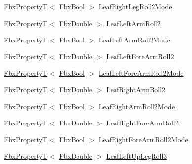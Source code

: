 \begin{DoxyCompactItemize}
\item 
\hyperlink{class_fbx_property_t}{Fbx\+PropertyT}$<$ \hyperlink{fbxtypes_8h_a92e0562b2fe33e76a242f498b362262e}{Fbx\+Bool} $>$ \hyperlink{class_fbx_character_adc56cbb72fb721c15569e4906be0b2bb}{Leaf\+Right\+Leg\+Roll2\+Mode}
\item 
\hyperlink{class_fbx_property_t}{Fbx\+PropertyT}$<$ \hyperlink{fbxtypes_8h_a171e72a1c46fc15c1a6c9c31948c1c5b}{Fbx\+Double} $>$ \hyperlink{class_fbx_character_a85afb25be41e4215494c040a5e162e14}{Leaf\+Left\+Arm\+Roll2}
\item 
\hyperlink{class_fbx_property_t}{Fbx\+PropertyT}$<$ \hyperlink{fbxtypes_8h_a92e0562b2fe33e76a242f498b362262e}{Fbx\+Bool} $>$ \hyperlink{class_fbx_character_a02394963e116e6ef922a28db31133830}{Leaf\+Left\+Arm\+Roll2\+Mode}
\item 
\hyperlink{class_fbx_property_t}{Fbx\+PropertyT}$<$ \hyperlink{fbxtypes_8h_a171e72a1c46fc15c1a6c9c31948c1c5b}{Fbx\+Double} $>$ \hyperlink{class_fbx_character_aca4aad2d5dc46cb61dd8ad54aeef10ff}{Leaf\+Left\+Fore\+Arm\+Roll2}
\item 
\hyperlink{class_fbx_property_t}{Fbx\+PropertyT}$<$ \hyperlink{fbxtypes_8h_a92e0562b2fe33e76a242f498b362262e}{Fbx\+Bool} $>$ \hyperlink{class_fbx_character_aef6a91eaa820543ae718cf34569a99be}{Leaf\+Left\+Fore\+Arm\+Roll2\+Mode}
\item 
\hyperlink{class_fbx_property_t}{Fbx\+PropertyT}$<$ \hyperlink{fbxtypes_8h_a171e72a1c46fc15c1a6c9c31948c1c5b}{Fbx\+Double} $>$ \hyperlink{class_fbx_character_a6444cc6b1cbea36a03d6555c7e0cf7b8}{Leaf\+Right\+Arm\+Roll2}
\item 
\hyperlink{class_fbx_property_t}{Fbx\+PropertyT}$<$ \hyperlink{fbxtypes_8h_a92e0562b2fe33e76a242f498b362262e}{Fbx\+Bool} $>$ \hyperlink{class_fbx_character_ad9796935aff85739df826d3b6ed63287}{Leaf\+Right\+Arm\+Roll2\+Mode}
\item 
\hyperlink{class_fbx_property_t}{Fbx\+PropertyT}$<$ \hyperlink{fbxtypes_8h_a171e72a1c46fc15c1a6c9c31948c1c5b}{Fbx\+Double} $>$ \hyperlink{class_fbx_character_a664e5dc50594ae77d3890192e9d2974e}{Leaf\+Right\+Fore\+Arm\+Roll2}
\item 
\hyperlink{class_fbx_property_t}{Fbx\+PropertyT}$<$ \hyperlink{fbxtypes_8h_a92e0562b2fe33e76a242f498b362262e}{Fbx\+Bool} $>$ \hyperlink{class_fbx_character_a518adb669169224767225c1e8a673f32}{Leaf\+Right\+Fore\+Arm\+Roll2\+Mode}
\item 
\hyperlink{class_fbx_property_t}{Fbx\+PropertyT}$<$ \hyperlink{fbxtypes_8h_a171e72a1c46fc15c1a6c9c31948c1c5b}{Fbx\+Double} $>$ \hyperlink{class_fbx_character_abebd72ca2e28adad945143805f05b56b}{Leaf\+Left\+Up\+Leg\+Roll3}

\end{DoxyCompactItemize}

